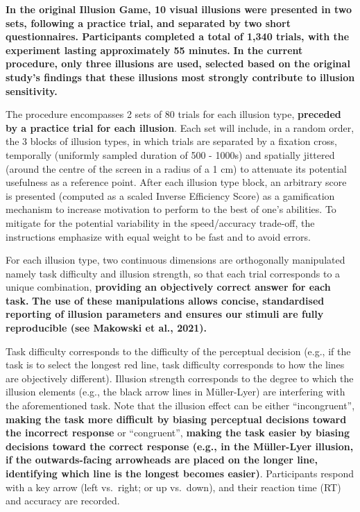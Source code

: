 \documentclass[
  man,
  floatsintext,
  longtable,
  nolmodern,
  notxfonts,
  notimes,
  colorlinks=true,linkcolor=blue,citecolor=blue,urlcolor=blue]{apa7}
\begin{document}
\textbf{In the original Illusion Game, 10 visual illusions were
presented in two sets, following a practice trial, and separated by two
short questionnaires. Participants completed a total of 1,340 trials,
with the experiment lasting approximately 55 minutes.} \textbf{In the
current procedure, only three illusions are used, selected based on the
original study's findings that these illusions most strongly contribute
to illusion sensitivity.}

The procedure encompasses 2 sets of 80 trials for each illusion type,
\textbf{preceded by a practice trial for each illusion}. Each set will
include, in a random order, the 3 blocks of illusion types, in which
trials are separated by a fixation cross, temporally (uniformly sampled
duration of 500 - 1000s) and spatially jittered (around the centre of
the screen in a radius of a 1 cm) to attenuate its potential usefulness
as a reference point. After each illusion type block, an arbitrary score
is presented (computed as a scaled Inverse Efficiency Score) as a
gamification mechanism to increase motivation to perform to the best of
one's abilities. To mitigate for the potential variability in the
speed/accuracy trade-off, the instructions emphasize with equal weight
to be fast and to avoid errors.

For each illusion type, two continuous dimensions are orthogonally
manipulated namely task difficulty and illusion strength, so that each
trial corresponds to a unique combination, \textbf{providing an
objectively correct answer for each task.} \textbf{The use of these
manipulations allows concise, standardised reporting of illusion
parameters and ensures our stimuli are fully reproducible (see Makowski
et al., 2021).}

Task difficulty corresponds to the difficulty of the perceptual decision
(e.g., if the task is to select the longest red line, task difficulty
corresponds to how the lines are objectively different). Illusion
strength corresponds to the degree to which the illusion elements (e.g.,
the black arrow lines in Müller-Lyer) are interfering with the
aforementioned task. Note that the illusion effect can be either
``incongruent'', \textbf{making the task more difficult by biasing
perceptual decisions toward the incorrect response} or ``congruent'',
\textbf{making the task easier by biasing decisions toward the correct
response (e.g., in the Müller-Lyer illusion, if the outwards-facing
arrowheads are placed on the longer line, identifying which line is the
longest becomes easier)}. Participants respond with a key arrow (left
vs.~right; or up vs.~down), and their reaction time (RT) and accuracy
are recorded.
\end{document}
